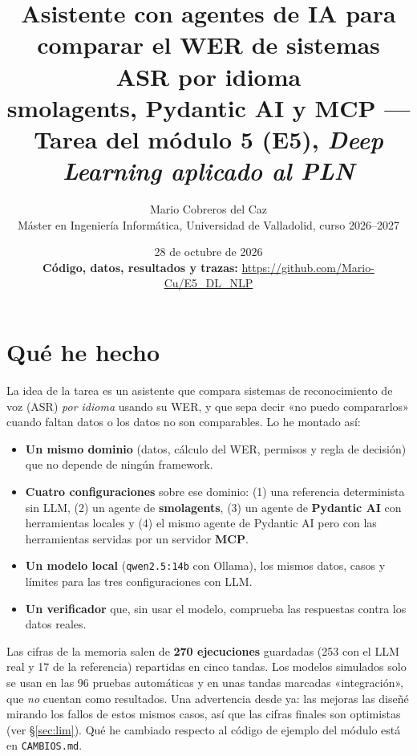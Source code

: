 \documentclass[10pt,a4paper]{article}
\title{\vspace{-1.2cm}\Large\textbf{Asistente con agentes de IA para comparar el WER de sistemas ASR por idioma}\\[2pt]
\normalsize smolagents, Pydantic AI y MCP --- Tarea del módulo 5 (E5), \emph{Deep Learning aplicado al PLN}}
\author{Mario Cobreros del Caz\\[1pt]\footnotesize Máster en Ingeniería Informática, Universidad de Valladolid, curso 2026--2027}
\date{\footnotesize 28 de octubre de 2026\\[2pt]
\textbf{Código, datos, resultados y trazas:} \url{https://github.com/Mario-Cu/E5_DL_NLP}}
\newcommand{\cod}[1]{\texttt{\small #1}}
\begin{document}
\maketitle
\vspace{-0.9cm}

\section{Qué he hecho}
La idea de la tarea es un asistente que compara sistemas de reconocimiento de voz (ASR) \emph{por idioma} usando su WER, y que sepa decir
«no puedo compararlos» cuando faltan datos o los datos no son comparables. Lo he montado así:

\begin{itemize}
\item \textbf{Un mismo dominio} (datos, cálculo del WER, permisos y regla de decisión) que no depende de ningún framework.
\item \textbf{Cuatro configuraciones} sobre ese dominio: (1) una referencia determinista sin LLM, (2) un agente de \textbf{smolagents}, (3) un agente de \textbf{Pydantic AI} con herramientas locales y (4) el mismo agente de Pydantic AI pero con las herramientas servidas por un servidor \textbf{MCP}.
\item \textbf{Un modelo local} (\cod{qwen2.5:14b} con Ollama), los mismos datos, casos y límites para las tres configuraciones con LLM.
\item \textbf{Un verificador} que, sin usar el modelo, comprueba las respuestas contra los datos reales.
\end{itemize}

Las cifras de la memoria salen de \textbf{270 ejecuciones} guardadas (253 con el LLM real y 17 de la referencia) repartidas en cinco tandas. Los modelos simulados solo se usan en las 96 pruebas automáticas y en unas tandas marcadas «integración», que \emph{no} cuentan como resultados.
Una advertencia desde ya: las mejoras las diseñé mirando los fallos de estos mismos casos, así que las cifras finales son optimistas (ver §\ref{sec:lim}).
Qué he cambiado respecto al código de ejemplo del módulo está en \cod{CAMBIOS.md}.
\end{document}
